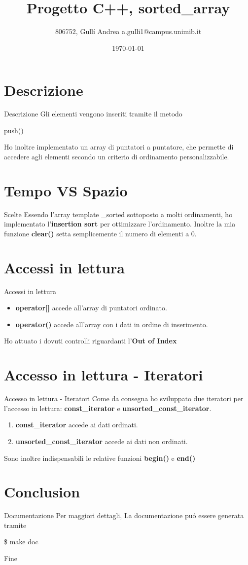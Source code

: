 \documentclass[10px]{beamer}
\title{Progetto C++, sorted\_array}
\date{\today}
\author{806752, Gull\'i Andrea a.gulli1@campus.unimib.it}
\institute{Milano Bicocca}
\newcommand*{\snippet}[2]{\colorbox{#1!30}{\parbox{.98\linewidth}{#2}}}
\begin{document}
\maketitle
\section{Descrizione}
\begin{frame}{Descrizione}
Gli elementi vengono inseriti tramite il metodo \snippet{gray}{push()}\newline
Ho inoltre implementato un array di puntatori a puntatore,
che permette di accedere agli elementi secondo un criterio di ordinamento personalizzabile.
\end{frame}
\section{Tempo VS Spazio}
\begin{frame}{Scelte}
Essendo l'array template \_sorted sottoposto a molti ordinamenti,
ho implementato l'\textbf{insertion sort} per ottimizzare l'ordinamento.\newline\newline
Inoltre la mia funzione \textbf{clear()} setta semplicemente il numero di elementi a 0.
\end{frame}
\section{Accessi in lettura}
\begin{frame}{Accessi in lettura}
\begin{itemize}
\item \textbf{operator[]} accede all'array di puntatori ordinato.
\item \textbf{operator()} accede all'array con i dati in ordine di inserimento.
\end{itemize}
Ho attuato i dovuti controlli riguardanti l'\textbf{Out of Index}
\end{frame}
\section{Accesso in lettura - Iteratori}
\begin{frame}{Accesso in lettura - Iteratori}
Come da consegna ho sviluppato due iteratori per l'accesso in lettura:\newline
\textbf{const\_iterator} e \textbf{unsorted\_const\_iterator}.
\begin{enumerate}
\item \textbf{const\_iterator} accede ai dati ordinati.
\item \textbf{unsorted\_const\_iterator} accede ai dati non ordinati.
\end{enumerate}
Sono inoltre indispensabili le relative funzioni \textbf{begin()} e \textbf{end()}
\end{frame}
\section{Conclusion}
\begin{frame}{Documentazione}
Per maggiori dettagli,\newline\newline
La documentazione pu\'o essere generata tramite \snippet{gray}{\$ make doc}
\end{frame}
\begin{frame}[standout]
Fine
\end{frame}
\end{document}
